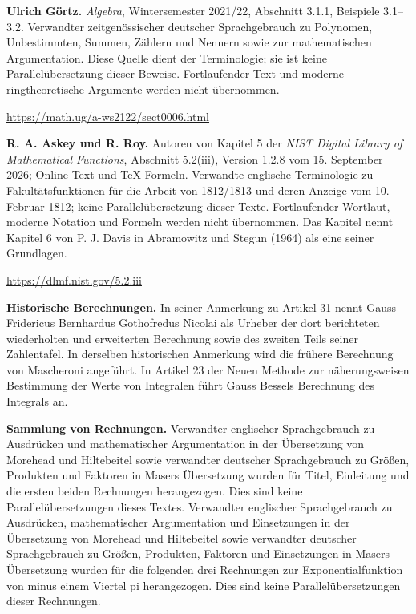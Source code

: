 \par\endgroup\clearpage\thispagestyle{empty}\begingroup\fontsize{9}{9.5}\selectfont\raggedright
{}\medskip
\par\medskip\textbf{Ulrich Görtz.} \emph{Algebra}, Wintersemester 2021/22, Abschnitt 3.1.1, Beispiele 3.1–3.2. Verwandter zeitgenössischer deutscher Sprachgebrauch zu Polynomen, Unbestimmten, Summen, Zählern und Nennern sowie zur mathematischen Argumentation. Diese Quelle dient der Terminologie; sie ist keine Parallelübersetzung dieser Beweise. Fortlaufender Text und moderne ringtheoretische Argumente werden nicht übernommen.\par
\url{https://math.ug/a-ws2122/sect0006.html}
\par\medskip\textbf{R. A. Askey und R. Roy.} Autoren von Kapitel 5 der \emph{NIST Digital Library of Mathematical Functions}, Abschnitt 5.2(iii), Version 1.2.8 vom 15. September 2026; Online-Text und TeX-Formeln. Verwandte englische Terminologie zu Fakultätsfunktionen für die Arbeit von 1812/1813 und deren Anzeige vom 10. Februar 1812; keine Parallelübersetzung dieser Texte. Fortlaufender Wortlaut, moderne Notation und Formeln werden nicht übernommen. Das Kapitel nennt Kapitel 6 von P. J. Davis in Abramowitz und Stegun (1964) als eine seiner Grundlagen.\par
\url{https://dlmf.nist.gov/5.2.iii}
\par\medskip\textbf{Historische Berechnungen.} In seiner Anmerkung zu Artikel 31 nennt Gauss Fridericus Bernhardus Gothofredus Nicolai als Urheber der dort berichteten wiederholten und erweiterten Berechnung sowie des zweiten Teils seiner Zahlentafel. In derselben historischen Anmerkung wird die frühere Berechnung von Mascheroni angeführt. In Artikel 23 der Neuen Methode zur näherungsweisen Bestimmung der Werte von Integralen führt Gauss Bessels Berechnung des Integrals an.
\par\medskip\textbf{Sammlung von Rechnungen.} Verwandter englischer Sprachgebrauch zu Ausdrücken und mathematischer Argumentation in der Übersetzung von Morehead und Hiltebeitel sowie verwandter deutscher Sprachgebrauch zu Größen, Produkten und Faktoren in Masers Übersetzung wurden für Titel, Einleitung und die ersten beiden Rechnungen herangezogen. Dies sind keine Parallelübersetzungen dieses Textes.
 Verwandter englischer Sprachgebrauch zu Ausdrücken, mathematischer Argumentation und Einsetzungen in der Übersetzung von Morehead und Hiltebeitel sowie verwandter deutscher Sprachgebrauch zu Größen, Produkten, Faktoren und Einsetzungen in Masers Übersetzung wurden für die folgenden drei Rechnungen zur Exponentialfunktion von minus einem Viertel pi herangezogen. Dies sind keine Parallelübersetzungen dieser Rechnungen.
